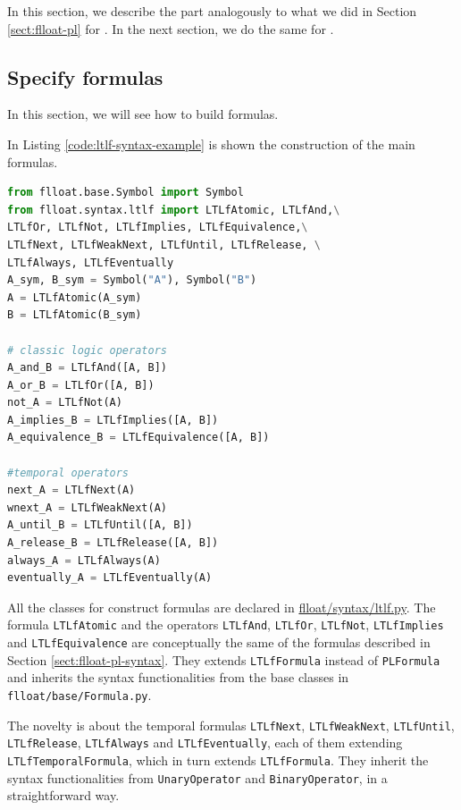 In this section, we describe the \LTLf part analogously to what we did in Section \ref{sect:flloat-pl} for \PL. In the next section, we do the same for \LDLf.

\subsection{Specify \LTLf formulas}\label{sect:flloat-ltlf-syntax}
In this section, we will see how to build \LTLf formulas.

In Listing \ref{code:ltlf-syntax-example} is shown the construction of the main \LTLf formulas.

\begin{lstlisting}[language=Python, style=Python, escapechar = £, label={code:ltlf-syntax-example}, caption={Examples of \LTLf formulas}]
from flloat.base.Symbol import Symbol
from flloat.syntax.ltlf import LTLfAtomic, LTLfAnd,\
LTLfOr, LTLfNot, LTLfImplies, LTLfEquivalence,\
LTLfNext, LTLfWeakNext, LTLfUntil, LTLfRelease, \
LTLfAlways, LTLfEventually
A_sym, B_sym = Symbol("A"), Symbol("B")
A = LTLfAtomic(A_sym)
B = LTLfAtomic(B_sym)

# classic logic operators
A_and_B = LTLfAnd([A, B])
A_or_B = LTLfOr([A, B])
not_A = LTLfNot(A)
A_implies_B = LTLfImplies([A, B])
A_equivalence_B = LTLfEquivalence([A, B])

#temporal operators
next_A = LTLfNext(A)
wnext_A = LTLfWeakNext(A)
A_until_B = LTLfUntil([A, B])
A_release_B = LTLfRelease([A, B])
always_A = LTLfAlways(A)
eventually_A = LTLfEventually(A)
\end{lstlisting}
All the classes for construct \LTLf formulas are declared in \href{https://github.com/MarcoFavorito/flloat/blob/0.1.4/flloat/syntax/ltlf.py}{flloat/syntax/ltlf.py}.
The formula \texttt{LTLfAtomic} and the operators \texttt{LTLfAnd}, \texttt{LTLfOr}, \texttt{LTLfNot}, \texttt{LTLfImplies} and \texttt{LTLfEquivalence} are conceptually the same of the \PL formulas described in Section \ref{sect:flloat-pl-syntax}. They extends \texttt{LTLfFormula} instead of \texttt{PLFormula} and inherits the syntax functionalities from the base classes in \texttt{flloat/base/Formula.py}.

The novelty is about the temporal formulas \texttt{LTLfNext}, \texttt{LTLfWeakNext}, \texttt{LTLfUntil}, \texttt{LTLfRelease}, \texttt{LTLfAlways} and \texttt{LTLfEventually}, each of them extending \texttt{LTLfTemporalFormula}, which in turn extends \texttt{LTLfFormula}. They inherit the syntax functionalities from \texttt{UnaryOperator} and \texttt{BinaryOperator}, in a straightforward way.

